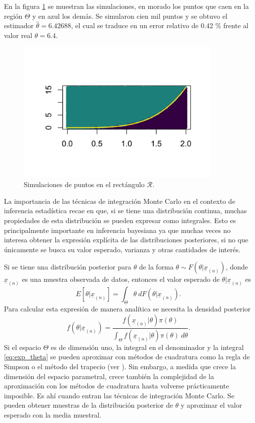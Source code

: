 \documentclass[11pt,a4paper]{article}
\begin{document}
\newpage

En la figura \ref{fig:sim_hx} se muestran las simulaciones, en morado los puntos que caen en la región $\Theta$ y en azul los demás. Se simularon cien mil puntos y se obtuvo el estimador $\hat{\theta} = 6.42688$, el cual se traduce en un error relativo de 0.42 \% frente al valor real $\theta = 6.4$.

\begin{figure}[h]
\centering\includegraphics[width=10cm]{sim_hx.png}
\caption{Simulaciones de puntos en el rectángulo $\mathcal{R}$.}
\label{fig:sim_hx}
\end{figure}

La importancia de las técnicas de integración Monte Carlo en el contexto de inferencia estadística recae en que, si se tiene una distribución continua, muchas propiedades de esta distribución se pueden expresar como integrales. Esto es principalmente importante en inferencia bayesiana ya que muchas veces no interesa obtener la expresión explícita de las distribuciones posteriores, si no que únicamente se busca su valor esperado, varianza y otras cantidades de interés.

Si se tiene una distribución posterior para $\theta$ de la forma $\theta \sim F(\theta | \underline{x}_{(n)})$, donde $\underline{x}_{(n)}$ es una muestra observada de datos, entonces el valor esperado de $\theta| \underline{x}_{(n)}$ es
\begin{equation}
\label{eq:exp_theta}
E[\theta | \underline{x}_{(n)}] = \int_{\Theta} \theta \ dF(\theta | \underline{x}_{(n)}).
\end{equation}
Para calcular esta expresión de manera analítica se necesita la densidad posterior $$f(\theta | \underline{x}_{(n)}) = \frac{f(\underline{x}_{(n)} | \theta)\pi (\theta)}{\int_{\Theta} f(\underline{x}_{(n)} | \theta)\pi (\theta) \ d\theta}.$$ Si el espacio $\Theta$ es de dimensión uno, la integral en el denominador y la integral \eqref{eq:exp_theta} se pueden aproximar con métodos de cuadratura como la regla de Simpson o el método del trapecio (ver \citet{burden}). Sin embargo, a medida que crece la dimensión del espacio parametral, crece también la complejidad de la aproximación con los métodos de cuadratura hasta volverse prácticamente imposible. Es ahí cuando entran las técnicas de integración Monte Carlo. Se pueden obtener muestras de la distribución posterior de $\theta$ y aproximar el valor esperado con la media muestral.
\end{document}
